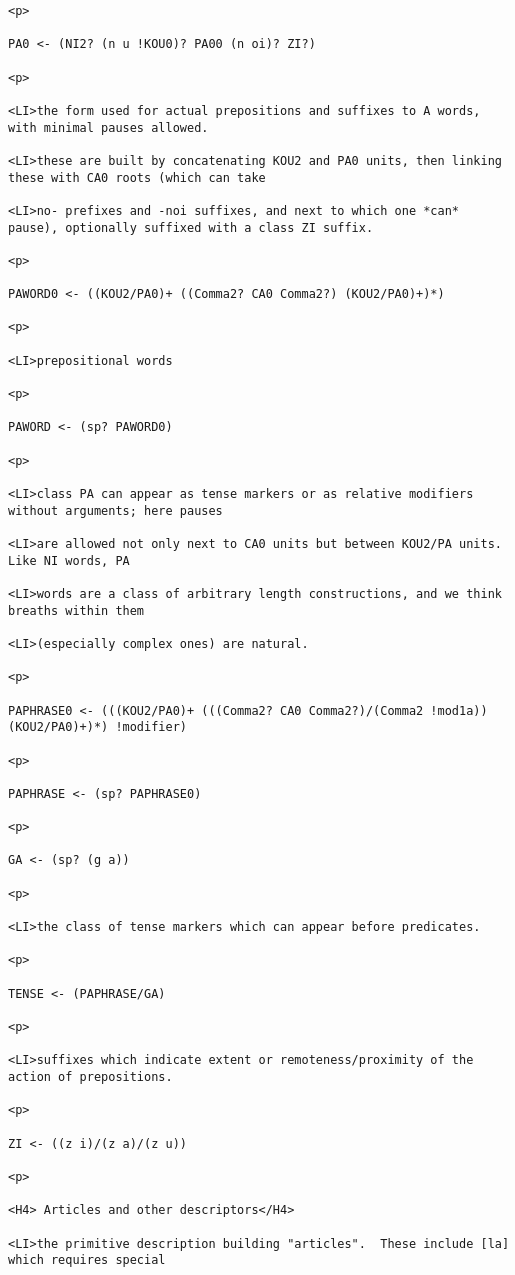 \documentclass[12pt]{article}
\begin{document}
\begin{lstlisting}
<p>

PA0 <- (NI2? (n u !KOU0)? PA00 (n oi)? ZI?)

<p>

<LI>the form used for actual prepositions and suffixes to A words, with minimal pauses allowed.

<LI>these are built by concatenating KOU2 and PA0 units, then linking these with CA0 roots (which can take

<LI>no- prefixes and -noi suffixes, and next to which one *can* pause), optionally suffixed with a class ZI suffix.

<p>

PAWORD0 <- ((KOU2/PA0)+ ((Comma2? CA0 Comma2?) (KOU2/PA0)+)*)

<p>

<LI>prepositional words

<p>

PAWORD <- (sp? PAWORD0)

<p>

<LI>class PA can appear as tense markers or as relative modifiers without arguments; here pauses

<LI>are allowed not only next to CA0 units but between KOU2/PA units.  Like NI words, PA

<LI>words are a class of arbitrary length constructions, and we think breaths within them

<LI>(especially complex ones) are natural.

<p>

PAPHRASE0 <- (((KOU2/PA0)+ (((Comma2? CA0 Comma2?)/(Comma2 !mod1a)) (KOU2/PA0)+)*) !modifier)

<p>

PAPHRASE <- (sp? PAPHRASE0)

<p>

GA <- (sp? (g a))

<p>

<LI>the class of tense markers which can appear before predicates.

<p>

TENSE <- (PAPHRASE/GA)

<p>

<LI>suffixes which indicate extent or remoteness/proximity of the action of prepositions.

<p>

ZI <- ((z i)/(z a)/(z u))

<p>

<H4> Articles and other descriptors</H4>

<LI>the primitive description building "articles".  These include [la] which requires special


\end{lstlisting}
\end{document}
